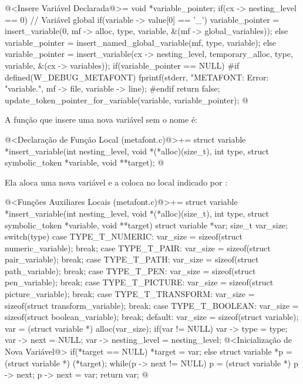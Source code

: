 \iniciocodigo
@<Insere Variável Declarada@>=
{
  void *variable_pointer;
  if(cx -> nesting_level == 0){ // Variável global
    if(variable -> value[0] == '_')
      variable_pointer = insert_variable(0, mf -> alloc, type, variable,
                                         &(mf -> global_variables));
    else
      variable_pointer = insert_named_global_variable(mf, type, variable);
  }
  else
    variable_pointer = insert_variable(cx -> nesting_level,
                                      temporary_alloc, type,
                                      variable, &(cx -> variables));
  if(variable_pointer == NULL){
#if defined(W_DEBUG_METAFONT)
      fprintf(stderr, "METAFONT: Error: %
                    "variable.\n", mf -> file, variable -> line);
#endif
    return false;
  }
  update_token_pointer_for_variable(variable, variable_pointer);
}
@
\fimcodigo

A função que insere uma nova variável sem o nome é:

\iniciocodigo
@<Declaração de Função Local (metafont.c)@>+=
struct variable *insert_variable(int nesting_level,
                                 void *(*alloc)(size_t),
                                 int type,
                                 struct symbolic_token *variable,
                                 void **target);
@
\fimcodigo

Ela aloca uma nova variável e a coloca no local indicado
por :

\iniciocodigo
@<Funções Auxiliares Locais (metafont.c)@>+=
struct variable *insert_variable(int nesting_level,
                                 void *(*alloc)(size_t),
                                 int type,
                                 struct symbolic_token *variable,
                                 void **target){
  struct variable *var;
  size_t var_size;
  switch(type){
    case TYPE_T_NUMERIC:
      var_size = sizeof(struct numeric_variable);
      break;
    case TYPE_T_PAIR:
      var_size = sizeof(struct pair_variable);
      break;
    case TYPE_T_PATH:
      var_size = sizeof(struct path_variable);
      break;
    case TYPE_T_PEN:
      var_size = sizeof(struct pen_variable);
      break;
    case TYPE_T_PICTURE:
      var_size = sizeof(struct picture_variable);
      break;
    case TYPE_T_TRANSFORM:
      var_size = sizeof(struct transform_variable);
      break;
    case TYPE_T_BOOLEAN:
      var_size = sizeof(struct boolean_variable);
      break;
    default:
      var_size = sizeof(struct variable);
  }
  var = (struct variable *) alloc(var_size);
  if(var != NULL){
    var -> type = type;
    var -> next = NULL;
    var -> nesting_level = nesting_level;
    @<Inicialização de Nova Variável@>
  }
  if(*target == NULL)
    *target = var;
  else{
    struct variable *p = (struct variable *) (*target);
    while(p -> next != NULL)
      p = (struct variable *) p -> next;
    p -> next = var;
  }
  return var;
}
@
\fimcodigo

